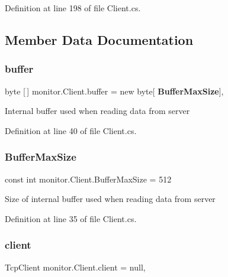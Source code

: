 Definition at line 198 of file Client.\+cs.



\subsection{Member Data Documentation}
\mbox{\label{classmonitor_1_1_client_abd5c33a23e0fab7b369b59ac296c7762}} 
\subsubsection{buffer}
{\footnotesize\ttfamily byte [$\,$] monitor.\+Client.\+buffer = new byte[\textbf{ Buffer\+Max\+Size}]\hspace{0.3cm}{\ttfamily [static]}, {\ttfamily [private]}}



Internal buffer used when reading data from server 



Definition at line 40 of file Client.\+cs.

\mbox{\label{classmonitor_1_1_client_acbc4cae14536eccb5297aacdadb84f29}} 
\subsubsection{Buffer\+Max\+Size}
{\footnotesize\ttfamily const int monitor.\+Client.\+Buffer\+Max\+Size = 512\hspace{0.3cm}{\ttfamily [private]}}



Size of internal buffer used when reading data from server 



Definition at line 35 of file Client.\+cs.

\mbox{\label{classmonitor_1_1_client_a4867b48ebfa930a80662c552f2911430}} 
\subsubsection{client}
{\footnotesize\ttfamily Tcp\+Client monitor.\+Client.\+client = null\hspace{0.3cm}{\ttfamily [static]}, {\ttfamily [private]}}



